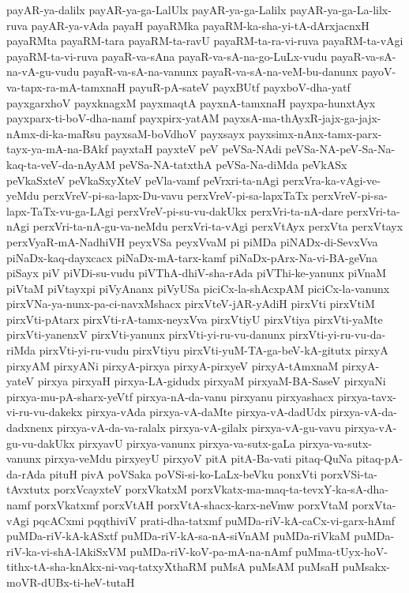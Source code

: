 {payAR-ya-dalilx
payAR-ya-ga-LalUlx
payAR-ya-ga-Lalilx
payAR-ya-ga-La-lilx-ruva
payAR-ya-vAda
payaH
payaRMka
payaRM-ka-sha-yi-tA-dArxjacnxH
payaRMta
payaRM-tara
payaRM-ta-ravU
payaRM-ta-ra-vi-ruva
payaRM-ta-vAgi
payaRM-ta-vi-ruva
payaR-va-sAna
payaR-va-sA-na-go-LuLx-vudu
payaR-va-sA-na-vA-gu-vudu
payaR-va-sA-na-vanunx
payaR-va-sA-na-veM-bu-danunx
payoV-va-tapx-ra-mA-tamxnaH
payuR-pA-sateV
payxBUtf
payxboV-dha-yatf
payxgarxhoV
payxknagxM
payxmaqtA
payxnA-tamxnaH
payxpa-hunxtAyx
payxparx-ti-boV-dha-namf
payxpirx-yatAM
payxsA-ma-thAyxR-jajx-ga-jajx-nAmx-di-ka-maRsu
payxsaM-boVdhoV
payxsayx
payxsimx-nAnx-tamx-parx-tayx-ya-mA-na-BAkf
payxtaH
payxteV
peV
peVSa-NAdi
peVSa-NA-peV-Sa-Na-kaq-ta-veV-da-nAyAM
peVSa-NA-tatxthA
peVSa-Na-diMda
peVkASx
peVkaSxteV
peVkaSxyXteV
peVla-vamf
peVrxri-ta-nAgi
perxVra-ka-vAgi-ve-yeMdu
perxVreV-pi-sa-lapx-Du-vavu
perxVreV-pi-sa-lapxTaTx
perxVreV-pi-sa-lapx-TaTx-vu-ga-LAgi
perxVreV-pi-su-vu-dakUkx
perxVri-ta-nA-dare
perxVri-ta-nAgi
perxVri-ta-nA-gu-va-neMdu
perxVri-ta-vAgi
perxVtAyx
perxVta
perxVtayx
perxVyaR-mA-NadhiVH
peyxVSa
peyxVvaM
pi
piMDa
piNADx-di-SevxVva
piNaDx-kaq-dayxcacx
piNaDx-mA-tarx-kamf
piNaDx-pArx-Na-vi-BA-geVna
piSayx
piV
piVDi-su-vudu
piVThA-dhiV-sha-rAda
piVThi-ke-yanunx
piVnaM
piVtaM
piVtayxpi
piVyAnanx
piVyUSa
piciCx-la-shAcxpAM
piciCx-la-vanunx
pirxVNa-ya-nunx-pa-ci-navxMshacx
pirxVteV-jAR-yAdiH
pirxVti
pirxVtiM
pirxVti-pAtarx
pirxVti-rA-tamx-neyxVva
pirxVtiyU
pirxVtiya
pirxVti-yaMte
pirxVti-yanenxV
pirxVti-yanunx
pirxVti-yi-ru-vu-danunx
pirxVti-yi-ru-vu-da-riMda
pirxVti-yi-ru-vudu
pirxVtiyu
pirxVti-yuM-TA-ga-beV-kA-gitutx
pirxyA
pirxyAM
pirxyANi
pirxyA-pirxya
pirxyA-pirxyeV
pirxyA-tAmxnaM
pirxyA-yateV
pirxya
pirxyaH
pirxya-LA-gidudx
pirxyaM
pirxyaM-BA-SaseV
pirxyaNi
pirxya-mu-pA-sharx-yeVtf
pirxya-nA-da-vanu
pirxyanu
pirxyashacx
pirxya-tavx-vi-ru-vu-dakekx
pirxya-vAda
pirxya-vA-daMte
pirxya-vA-dadUdx
pirxya-vA-da-dadxnenx
pirxya-vA-da-va-ralalx
pirxya-vA-gilalx
pirxya-vA-gu-vavu
pirxya-vA-gu-vu-dakUkx
pirxyavU
pirxya-vanunx
pirxya-va-sutx-gaLa
pirxya-va-sutx-vanunx
pirxya-veMdu
pirxyeyU
pirxyoV
pitA
pitA-Ba-vati
pitaq-QuNa
pitaq-pA-da-rAda
pituH
pivA
poVSaka
poVSi-si-ko-LaLx-beVku
ponxVti
porxVSi-ta-tAvxtutx
porxVcayxteV
porxVkatxM
porxVkatx-ma-maq-ta-tevxY-ka-sA-dha-namf
porxVkatxmf
porxVtAH
porxVtA-shacx-karx-neVmw
porxVtaM
porxVta-vAgi
pqcACxmi
pqqthiviV
prati-dha-tatxmf
puMDa-riV-kA-caCx-vi-garx-hAmf
puMDa-riV-kA-kASxtf
puMDa-riV-kA-sa-nA-siVnAM
puMDa-riVkaM
puMDa-riV-ka-vi-shA-lAkiSxVM
puMDa-riV-koV-pa-mA-na-nAmf
puMma-tUyx-hoV-tithx-tA-sha-knAkx-ni-vaq-tatxyXthaRM
puMsA
puMsAM
puMsaH
puMsakx-moVR-dUBx-ti-heV-tutaH
}
